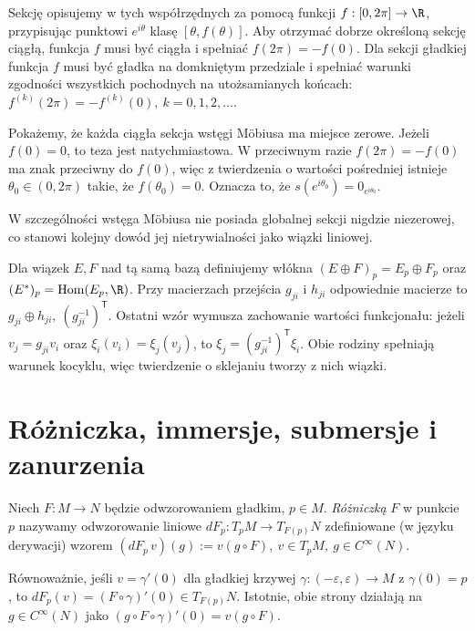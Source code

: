 \begin{przyklad}
Sekcję opisujemy w tych współrzędnych za pomocą
funkcji $f:[0,2\pi]\to\R$, przypisując punktowi
$e^{i\theta}$ klasę $[\theta,f(\theta)]$.
Aby otrzymać dobrze określoną sekcję ciągłą,
funkcja $f$ musi być ciągła i spełniać $f(2\pi)=-f(0)$.
Dla sekcji gładkiej funkcja $f$ musi być gładka na domkniętym
przedziale i spełniać warunki zgodności wszystkich pochodnych
na utożsamianych końcach: $f^{(k)}(2\pi)=-f^{(k)}(0), \ k=0,1,2,\ldots$.

Pokażemy, że każda ciągła sekcja wstęgi Möbiusa
ma miejsce zerowe. Jeżeli $f(0)=0$, to teza
jest natychmiastowa. W przeciwnym razie
$f(2\pi)=-f(0)$ ma znak przeciwny do $f(0)$,
więc z twierdzenia o wartości pośredniej istnieje
$\theta_0\in(0,2\pi)$ takie, że $f(\theta_0)=0$.
Oznacza to, że $s(e^{i\theta_0})=0_{e^{i\theta_0}}$.

W szczególności wstęga Möbiusa nie posiada
globalnej sekcji nigdzie niezerowej, co stanowi
kolejny dowód jej nietrywialności jako wiązki
liniowej.
\end{przyklad}


\begin{definicja}
Dla wiązek $E,F$ nad tą samą bazą definiujemy włókna
$(E\oplus F)_p=E_p\oplus F_p$ oraz
$(E^*)_p=\mathrm{Hom}(E_p,\R)$. Przy macierzach przejścia $g_{ji}$
i $h_{ji}$ odpowiednie macierze to $g_{ji}\oplus h_{ji},\ (g_{ji}^{-1})^{\mathsf T}$.
Ostatni wzór wymusza zachowanie wartości funkcjonału:
jeżeli $v_j=g_{ji}v_i$ oraz $\xi_i(v_i)=\xi_j(v_j)$, to
$\xi_j=(g_{ji}^{-1})^{\mathsf T}\xi_i$. Obie rodziny spełniają
warunek kocyklu, więc twierdzenie o sklejaniu tworzy z nich wiązki.
\end{definicja}



\section{Różniczka, immersje, submersje i zanurzenia}

\begin{definicja}
Niech $F\colon M\to N$ będzie odwzorowaniem gładkim, $p\in M$. \emph{Różniczką} $F$ w
punkcie $p$ nazywamy odwzorowanie liniowe $dF_p\colon T_pM\to T_{F(p)}N$ zdefiniowane (w
języku derywacji) wzorem $(dF_p\,v)(g):=v(g\circ F), \ v\in T_pM,\ g\in C^\infty(N)$.

Równoważnie, jeśli $v=\gamma'(0)$ dla gładkiej krzywej
$\gamma\colon(-\varepsilon,\varepsilon)\to M$ z $\gamma(0)=p$, to $dF_p(v)=(F\circ\gamma)'(0)\in T_{F(p)}N$.
Istotnie, obie strony działają na $g\in C^\infty(N)$ jako
$(g\circ F\circ\gamma)'(0)=v(g\circ F)$. 
\end{definicja}

